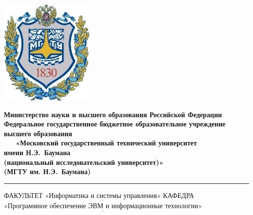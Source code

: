 \documentclass[a4paper, 12pt]{article}
\begin{document}
\begin{titlepage}
	\noindent \begin{minipage}{0.13\textwidth}
	\includegraphics[width=\linewidth]{bauman_logo}
	\end{minipage}
	\noindent\begin{minipage}{0.87\textwidth}\centering
		\textbf{Министерство науки и высшего образования Российской Федерации}\\
		\textbf{Федеральное государственное бюджетное образовательное учреждение высшего образования}\\
		\textbf{~~~«Московский государственный технический университет\\имени Н.Э.~Баумана}\\
		\textbf{(национальный исследовательский университет)»}\\
		\textbf{(МГТУ им. Н.Э.~Баумана)}
	\end{minipage}
	\begin{normalsize}
	\noindent\rule{17cm}{3pt}
	\newline\newline
	\noindent ФАКУЛЬТЕТ $\underline{\text{«Информатика и системы управления»}}$ \newline\newline
	\noindent КАФЕДРА $\underline{\text{«Программное обеспечение ЭВМ и информационные технологии»}}$\newline\newline
	

\end{normalsize}
\end{titlepage}
\end{document}
